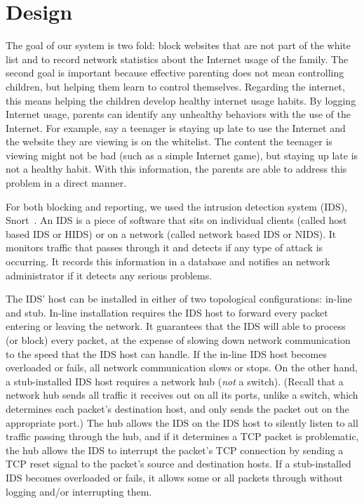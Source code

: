 
\section{Design}

The goal of our system is two fold: block websites that are not part of the
white list and to record network statistics about the Internet usage of the
family. 
%
The second goal is important because effective parenting does not mean
controlling children, but helping them learn to control themselves.  
%
Regarding the internet, this means helping the children develop healthy
internet usage habits.
%
By logging Internet usage, parents can identify any unhealthy behaviors with the
use of the Internet. 
%
For example, say a teenager is staying up late to use the Internet and the
website they are viewing is on the whitelist.
%
The content the teenager is viewing might not be bad (such as a simple
Internet game), but staying up late is not a healthy habit.
%
With this information, the parents are able to address this problem in a
direct manner.

For both blocking and reporting, we used the intrusion detection system (IDS),
Snort~\cite{snort}. An IDS is a piece of software that sits on individual
clients (called host based IDS or HIDS) or on a network (called network based
IDS or NIDS). It monitors traffic that passes through it and detects if any
type of attack is occurring. It records this information in a database
and notifies an network administrator if it detects any serious problems.

The IDS' host can be installed in either of two topological configurations:
in-line and stub.
%
In-line installation requires the IDS host to forward every packet entering or
leaving the network.
%
It guarantees that the IDS will able to process (or block) every packet, at
the expense of slowing down network communication to the speed that the IDS
host can handle.
%
If the in-line IDS host becomes overloaded or fails, all network communication slows
or stops.
%
On the other hand, a stub-installed IDS host requires a network hub (\emph{not} a
switch).
%
(Recall that a network hub sends all traffic it receives out on all its ports,
unlike a switch, which determines each packet's destination host, and only
sends the packet out on the appropriate port.)
%
The hub allows the IDS on the IDS host to silently listen to all traffic
passing through the hub, and if it determines a TCP packet is problematic, the
hub allows the IDS to interrupt the packet's TCP connection by sending a TCP
reset signal to the packet's source and destination hosts.
%
If a stub-installed IDS becomes overloaded or fails, it allows some or all
packets through without logging and/or interrupting them.

